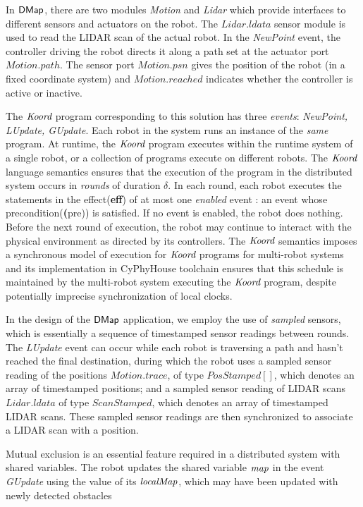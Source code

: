 In ${\sf DMap}$, there are two modules \emph{Motion} and \emph{Lidar} which provide interfaces to different sensors and actuators on the robot. The $\mathit{Lidar.ldata}$ sensor module is used to read the LIDAR scan of the actual robot. In the \emph{NewPoint} event, the controller driving the robot directs it along a path set at the actuator port $\mathit{Motion.path}$. The sensor port $\mathit{Motion.psn}$ gives the position of the robot (in a fixed coordinate system) and $\mathit{Motion.reached}$ indicates whether the controller is active or inactive.

The $\emph{Koord}$ program corresponding to this solution has three \emph{events}: \emph{NewPoint, LUpdate, GUpdate}. Each robot in the system runs an instance of the \emph{same} program. At runtime, the $\emph{Koord}$ program executes within the runtime system of a single robot, or a collection of programs execute on different robots. The $\emph{Koord}$ language semantics ensures that the execution of the program in the distributed system occurs in \emph{rounds} of duration $\delta$. In each round, each robot executes the statements in the effect(\textbf{eff}) of at most one \emph{enabled} event : an event whose precondition(\textbf(pre)) is satisfied. If no event is enabled, the robot does nothing. Before the next round of execution, the robot may continue to interact with the physical environment as directed by its controllers. The $\emph{Koord}$ semantics imposes a synchronous model of execution for $\emph{Koord}$ programs for multi-robot systems and its implementation in CyPhyHouse toolchain ensures that this schedule is maintained by the multi-robot system executing the $\emph{Koord}$ program, despite potentially imprecise synchronization of local clocks.

In the design of the ${\sf DMap}$ application, we employ the use of \emph{sampled} sensors, which is essentially a sequence of timestamped sensor readings between rounds. The \emph{LUpdate} event can occur while each robot is traversing a path and hasn't reached the final destination, during which the robot uses a sampled sensor reading of the positions $\mathit{Motion.trace}$, of type $\mathit{PosStamped}[]$, which denotes an array of timestamped positions; and a sampled sensor reading of LIDAR scans $\mathit{Lidar.ldata}$ of type $\mathit{ScanStamped}$, which denotes an array of timestamped LIDAR scans. These sampled sensor readings are then synchronized to associate a LIDAR scan with a position.

Mutual exclusion is an essential feature required in a distributed system with shared variables. The robot updates the shared variable $\mathit{map}$ in the event \emph{GUpdate} using the value of its $\mathit{localMap}$, which may have been updated with newly detected obstacles


